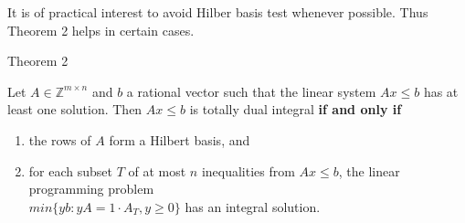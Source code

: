 \documentclass{beamer}
\begin{document}
	





\begin{frame}

	\begin{block}

		It is of practical interest to avoid Hilber basis test whenever possible. Thus Theorem 2 helps in certain cases.

	\end{block}

	\pause

	\begin{block}{Theorem 2}

		Let $A\in \mathbb{Z}^{m \times n}$ and $b$ a rational vector such that the linear system $Ax \leq b$ has at least one solution. Then $Ax \leq b$ is totally dual integral \textbf{if and only if}\\

		\begin{enumerate}[i]

			\item the rows of $A$ form a Hilbert basis, and

			\item for each subset $T$ of at most $n$ inequalities from $Ax\leq b$, the linear programming problem \\
			$min\{yb: yA=1\cdot A_T, y\geq 0 \}$ has an integral solution.

		\end{enumerate}

	\end{block}

\end{frame}
\end{document}
